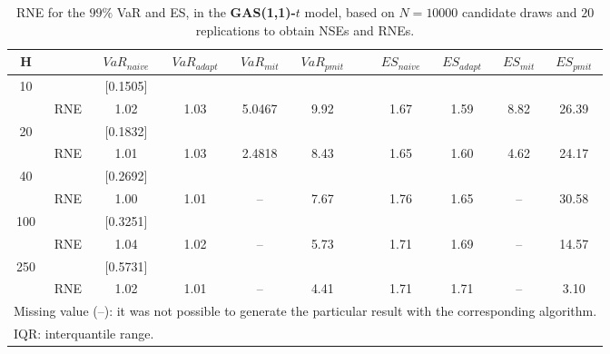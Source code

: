 \footnotesize{  
{ \renewcommand{\arraystretch}{1.3} 
\begin{longtable}{ccccccccccc}  
\caption{RNE for the $99\%$ VaR and ES, in the \textbf{GAS(1,1)-$t$} model, based on $N=10000$ candidate draws and $20$ replications to obtain NSEs and RNEs.} 
\label{tab:res_RNE_t_gas} \\ 
 H & & $VaR_{naive}$ & $VaR_{adapt}$ & $VaR_{mit}$  & $VaR_{pmit}$ &  & $ES_{naive}$ & $ES_{adapt}$ & $ES_{mit}$ & $ES_{pmit}$ \\ \hline 
10 & & $[$0.1505$]$  \\  
  & RNE &   1.02 &   1.03 & 5.0467 &   9.92 &  &  1.67 &   1.59 &    8.82 &  26.39   \\ [1ex] 
20 & & $[$0.1832$]$  \\  
  & RNE &   1.01 &   1.03 & 2.4818 &   8.43 &  &  1.65 &   1.60 &    4.62 &  24.17   \\ [1ex] 
40 & & $[$0.2692$]$  \\  
  & RNE &   1.00 &   1.01 &    -- &   7.67 &  &  1.76 &   1.65 &     -- &  30.58   \\ [1ex] 
100 & & $[$0.3251$]$  \\  
  & RNE &   1.04 &   1.02 &    -- &   5.73 &  &  1.71 &   1.69 &     -- &  14.57   \\ [1ex] 
250 & & $[$0.5731$]$  \\  
  & RNE &   1.02 &   1.01 &    -- &   4.41 &  &  1.71 &   1.71 &     -- &   3.10   \\ [1ex] 
\hline 
  \multicolumn{11}{l}{\footnotesize{Missing value (--): it was not possible to generate the particular result with the corresponding algorithm.}} \\ 
  \multicolumn{11}{l}{\footnotesize{IQR: interquantile range.}} \\ 
\end{longtable} 
} 
} 
\normalsize 

